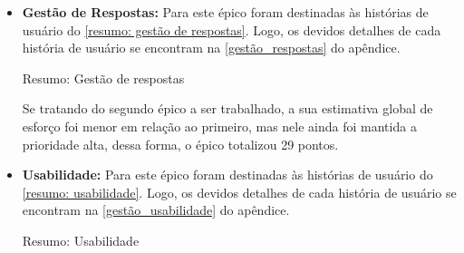 \begin{itemize}
\item {\textbf{Gestão de Respostas:}} Para este épico foram destinadas às histórias de usuário do \autoref{resumo: gestão de respostas}. Logo, os devidos detalhes de cada história de usuário se encontram na \autoref{gestão_respostas} do apêndice.

\def\arraystretch{2}
\begin{quadro}[htb]
\centering
\ABNTEXfontereduzida
\caption{Resumo: Gestão de respostas}
\label{resumo: gestão de respostas}
\end{quadro}
\FloatBarrier 

Se tratando do segundo épico a ser trabalhado, a sua estimativa global de esforço foi menor em relação ao primeiro, mas nele ainda foi mantida a prioridade alta, dessa forma, o épico totalizou 29 pontos.

\item {\textbf{Usabilidade:}} Para este épico foram destinadas às histórias de usuário do \autoref{resumo: usabilidade}. Logo, os devidos detalhes de cada história de usuário se encontram na \autoref{gestão_usabilidade} do apêndice.

\def\arraystretch{2}
\begin{quadro}[htb]
\centering
\ABNTEXfontereduzida
\caption{Resumo: Usabilidade}
\label{resumo: usabilidade}
\end{quadro}
\end{itemize}

